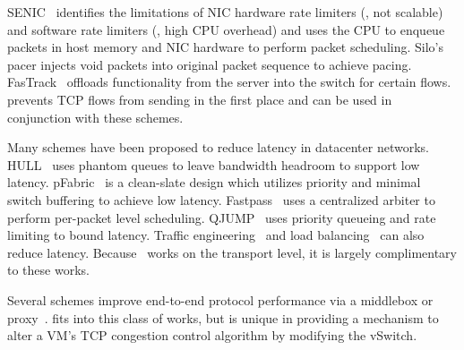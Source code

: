 SENIC~\cite{niranjan2013fastrak} 
identifies the limitations of NIC hardware rate limiters (\ie{}, not scalable) and 
software rate limiters (\ie{}, high CPU overhead) and uses the CPU to enqueue packets 
in host memory and NIC hardware to perform packet scheduling. Silo's pacer injects void packets into 
original packet sequence to achieve pacing. FasTrack~\cite{niranjan2013fastrak} offloads
functionality from the server into the switch for certain flows.~\acdc{} prevents
TCP flows from sending in the first place and can be used in conjunction with these
schemes.


Many schemes have been proposed to reduce latency in datacenter networks.
HULL~\cite{alizadeh2012less} uses phantom queues to leave bandwidth headroom to support low latency.
pFabric~\cite{alizadeh2013pfabric} is a clean-slate
design which utilizes priority and minimal switch buffering to achieve low latency.
Fastpass~\cite{perry2014fastpass} uses a centralized arbiter to
perform per-packet level scheduling.
QJUMP~\cite{qjump} uses priority queueing and rate limiting to
bound latency. Traffic engineering~\cite{al2010hedera,rasley2014planck} and 
load balancing~\cite{alizadeh2014conga,he2015presto,ghorbani2015micro} can also
reduce latency. Because~\acdc{} works on the transport level, it is
largely complimentary to these works.

Several schemes improve end-to-end protocol performance via a middlebox
or proxy~\cite{RFC3449,RFC3115,balakrishnan2008maelstrom,davern2011httpep,balakrishnan1995improving}.
\acdc{} fits into this class of works, but is unique in providing a mechanism
to alter a VM's TCP congestion control algorithm by modifying the vSwitch.
